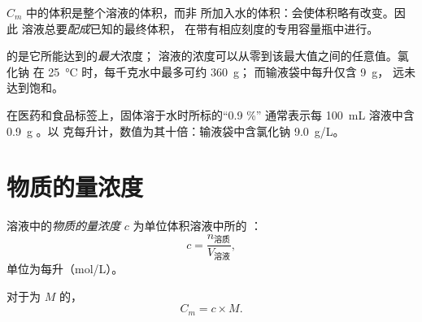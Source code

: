 \begin{remark}[体积指溶液的体积]\label{rem:g10:concentration-and-dilution:volume}
$C_m$ 中的体积是整个溶液的体积，而非
所加入水的体积：会使体积略有改变。因此
溶液总要\emph{配成}已知的最终体积，
在带有相应刻度的专用容量瓶中进行。
\end{remark}

\begin{remark}[浓度不等于溶解度]\label{rem:g10:concentration-and-dilution:not-solubility}
的是它所能达到的\emph{最大}浓度；
溶液的浓度可以从零到该最大值之间的任意值。氯化钠
在 \qty{25}{\celsius} 时，每千克水中最多可约 \qty{360}{g}；
而输液袋中每升仅含 \qty{9}{g}，
远未达到饱和。
\end{remark}

\begin{remark}[标签上的百分数]\label{rem:g10:concentration-and-dilution:percent}
在医药和食品标签上，固体溶于水时所标的“0.9 \%”
通常表示每 \qty{100}{mL} 溶液中含 \qty{0.9}{g} 。以
克每升计，数值为其十倍：输液袋中含氯化钠
\qty{9.0}{g/L}。
\end{remark}

\section{物质的量浓度}

\begin{definition}[物质的量浓度]\label{def:g10:concentration-and-dilution:molar-concentration}
溶液中的\emph{物质的量浓度} $c$
为单位体积溶液中所的
：
\[
  c = \frac{n_{\text{溶质}}}{V_{\text{溶液}}},
\]
单位为每升（\si{mol/L}）。
\end{definition}

\begin{proposition}[两种浓度之间的换算]\label{prop:g10:concentration-and-dilution:link}
对于为 $M$ 的，
\[
  C_m = c \times M .
\]
\end{proposition}

